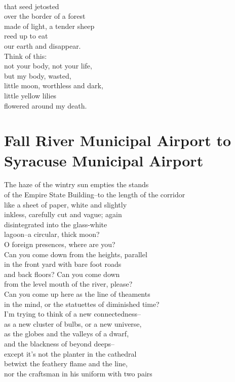 \documentclass[smalldemyvopaper,11pt,twoside,onecolumn,openright,extrafontsizes]{memoir}
\begin{document}
\\that seed jetosted
\\over the border of a forest
\\made of light, a tender sheep
\\reed up to eat
\\our earth and disappear.
\\Think of this:
\\not your body, not your life,
\\but my body, wasted,
\\little moon, worthless and dark,
\\little yellow lilies
\\flowered around my death.



\chapter{Fall River Municipal Airport to Syracuse Municipal Airport}
The haze of the wintry sun empties the stands
\\of the Empire State Building--to the length of the corridor
\\like a sheet of paper, white and slightly
\\inkless, carefully cut and vague; again
\\disintegrated into the glass-white
\\lagoon--a circular, thick moon?
\\O foreign presences, where are you?
\\Can you come down from the heights, parallel
\\in the front yard with bare foot roads
\\and back floors? Can you come down
\\from the level mouth of the river, please?
\\Can you come up here as the line of theaments
\\in the mind, or the statuettes of diminished time?
\\I'm trying to think of a new connectedness--
\\as a new cluster of bulbs, or a new universe,
\\as the globes and the valleys of a dwarf,
\\and the blackness of beyond deeps--
\\except it's not the planter in the cathedral
\\betwixt the feathery flame and the line,
\\nor the craftsman in his uniform with two pairs
\end{document}
